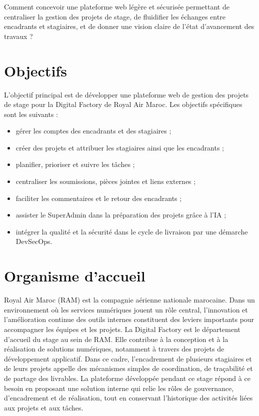 Comment concevoir une plateforme web légère et sécurisée permettant de centraliser la gestion des projets de stage, de fluidifier les échanges entre encadrants et stagiaires, et de donner une vision claire de l'état d'avancement des travaux ?

\section{Objectifs}
L'objectif principal est de développer une plateforme web de gestion des projets de stage pour la Digital Factory de Royal Air Maroc. Les objectifs spécifiques sont les suivants :
\begin{itemize}
  \item gérer les comptes des encadrants et des stagiaires ;
  \item créer des projets et attribuer les stagiaires ainsi que les encadrants ;
  \item planifier, prioriser et suivre les tâches ;
  \item centraliser les soumissions, pièces jointes et liens externes ;
  \item faciliter les commentaires et le retour des encadrants ;
  \item assister le SuperAdmin dans la préparation des projets grâce à l'IA ;
  \item intégrer la qualité et la sécurité dans le cycle de livraison par une démarche DevSecOps.
\end{itemize}

\section{Organisme d'accueil}
Royal Air Maroc (RAM) est la compagnie aérienne nationale marocaine. Dans un environnement où les services numériques jouent un rôle central, l'innovation et l'amélioration continue des outils internes constituent des leviers importants pour accompagner les équipes et les projets. La Digital Factory est le département d'accueil du stage au sein de RAM. Elle contribue à la conception et à la réalisation de solutions numériques, notamment à travers des projets de développement applicatif. Dans ce cadre, l'encadrement de plusieurs stagiaires et de leurs projets appelle des mécanismes simples de coordination, de traçabilité et de partage des livrables. La plateforme développée pendant ce stage répond à ce besoin en proposant une solution interne qui relie les rôles de gouvernance, d'encadrement et de réalisation, tout en conservant l'historique des activités liées aux projets et aux tâches.

